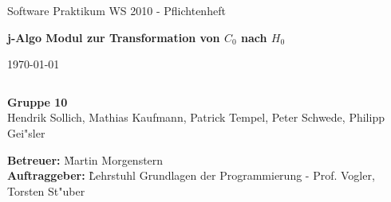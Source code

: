 \thispagestyle{empty}

\vspace*{3cm}
\begin{center}
\Large{Software Praktikum WS 2010 - Pflichtenheft}\\
\end{center}

\begin{center}
\textbf{\LARGE{j-Algo Modul zur Transformation von $C_0$ nach $H_0$}}
\end{center}

\begin{center}
\today
\end{center}

\begin{verbatim}

\end{verbatim}
\begin{center}
\textbf{Gruppe 10} \\
Hendrik Sollich, Mathias Kaufmann, Patrick Tempel, Peter Schwede, Philipp Gei"sler

\end{center}

\vspace*{10cm} 

\begin{flushleft}
\begin{tabbing}
\textbf{Betreuer:} \` Martin Morgenstern \\
\textbf{Auftraggeber:} \` Lehrstuhl Grundlagen der Programmierung - Prof. Vogler, Torsten St"uber \\
\end{tabbing}
\end{flushleft}
